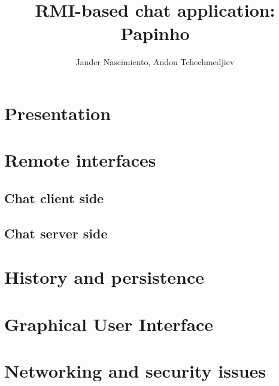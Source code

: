 \documentclass[8pt,a4paper]{article}
\title {RMI-based chat application: Papinho}
\author{Jander Nascimiento, Andon Tchechmedjiev}
\begin{document}
\maketitle
\section{Presentation}
\section{Remote interfaces}
\subsection{Chat client side}
\subsection{Chat server side}
\section{History and persistence}
\section{Graphical User Interface}
\section{Networking and security issues}
\end{document}
